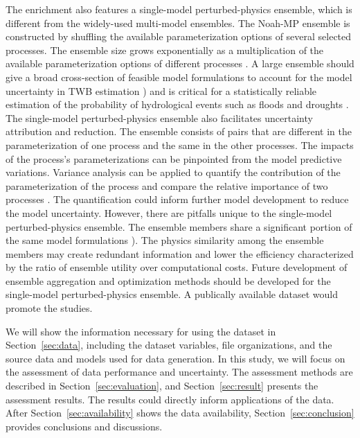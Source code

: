 \documentclass[essd]{copernicus}
\begin{document}
The enrichment also features a single-model perturbed-physics ensemble, which is
different from the widely-used multi-model ensembles. The Noah-MP ensemble is
constructed by shuffling the available parameterization options of several
selected processes. The ensemble size grows exponentially as a multiplication of
the available parameterization options of different processes
\citep{yang2011JGRA, zhang2016JGRA, gan2019WRR}. A large ensemble should give a
broad cross-section of feasible model formulations to account for the model
uncertainty in TWB estimation \citep{telteu2021GMD, mitchell2004JGRA}) and is
critical for a statistically reliable estimation of the probability of
hydrological events such as floods and droughts \citep{troin2021WRR}. The
single-model perturbed-physics ensemble also facilitates uncertainty attribution
and reduction. The ensemble consists of pairs that are different in the
parameterization of one process and the same in the other processes. The impacts
of the process’s parameterizations can be pinpointed from the model predictive
variations. Variance analysis can be applied to quantify the contribution of the
parameterization of the process and compare the relative importance of two
processes \citep{clark2011WRR, zheng2019WRR}. The quantification could inform
further model development to reduce the model uncertainty. However, there are
pitfalls unique to the single-model perturbed-physics ensemble. The ensemble
members share a significant portion of the same model formulations
\citep{fei2021WRR}). The physics similarity among the ensemble members may
create redundant information and lower the efficiency characterized by the ratio
of ensemble utility over computational costs. Future development of ensemble
aggregation and optimization methods should be developed for the single-model
perturbed-physics ensemble. A publically available dataset would promote the
studies.

We will show the information necessary for using the dataset in
Section~\ref{sec:data}, including the dataset variables, file organizations, and
the source data and models used for data generation. In this study, we will
focus on the assessment of data performance and uncertainty. The assessment
methods are described in Section~\ref{sec:evaluation}, and
Section~\ref{sec:result} presents the assessment results. The results could
directly inform applications of the data. After Section~\ref{sec:availability}
shows the data availability, Section~\ref{sec:conclusion} provides conclusions
and discussions.
\end{document}

